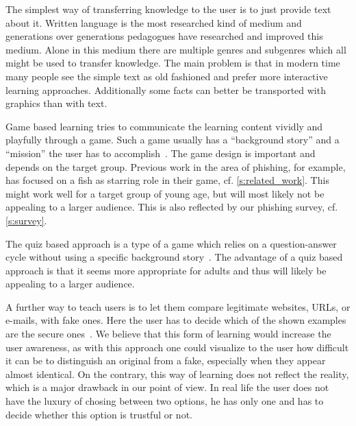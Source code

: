 \begin{description}[leftmargin=0cm]
    \item[Simple Text] The simplest way of transferring knowledge to the user is to just provide text about it.
    Written language is the most researched kind of medium and generations over generations pedagogues have researched and improved this medium.
    Alone in this medium there are multiple genres and subgenres which all might be used to transfer knowledge.
    The main problem is that in modern time many people see the simple text as old fashioned and prefer more interactive learning approaches. 
    Additionally some facts can better be transported with graphics than with text.
    
	\item[Game Based Learning] Game based learning tries to communicate the learning content vividly and playfully through a game.
 Such a game usually has a ``background story'' and a ``mission'' the user has to accomplish~\cite{sheng2007antiphishingphil,antiphishingphyllis}. The game design is important and depends on the target group.
 Previous work in the area of phishing, for example, has focused on a fish as starring role in their game, cf. \autoref{s:related_work}. This might work well for a target group of young age, but will most likely not be appealing to a larger audience.
 This is also reflected by our phishing survey, cf. \autoref{s:survey}.
	\item[Quiz Based Learning] The quiz based approach is a type of a game which relies on a question-answer cycle without using a specific background story~\cite{onguardonline}. The advantage of a quiz based approach is that it seems more appropriate for adults and thus will likely be appealing to a larger audience.

	\item[Comparison Based Learning] A further way to teach users is to let them compare legitimate websites, URLs, or e-mails, with fake ones.
 Here the user has to decide which of the shown examples are the secure ones~\cite{staysafeonline}. 
We believe that this form of learning would increase the user awareness, as with this approach one could visualize to the user how difficult it can be to distinguish an original from a fake, especially when they appear almost identical.
 On the contrary, this way of learning does not reflect the reality, which is a major drawback in our point of view.
 In real life the user does not have the luxury of chosing between two options, he has only one and has to decide whether this option is trustful or not.


\end{description}
